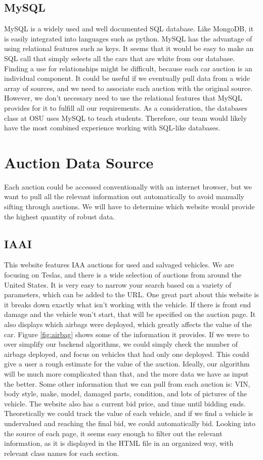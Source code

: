 \documentclass[draftclsnofoot,onecolumn,10pt]{IEEEtran}
\begin{document}
\subsection{MySQL}
MySQL is a widely used and well documented SQL database. Like MongoDB, it is easily integrated into languages such as python. MySQL has the advantage of using relational features such as keys. It seems that it would be easy to make an SQL call that simply selects all the cars that are white from our database. Finding a use for relationships might be difficult, because each car auction is an individual component. It could be useful if we eventually pull data from a wide array of sources, and we need to associate each auction with the original source. However, we don't necessary need to use the relational features that MySQL provides for it to fulfill all our requirements. As a consideration, the databases class at OSU uses MySQL to teach students. Therefore, our team would likely have the most combined experience working with SQL-like databases. \cite{mySQL}

\section{Auction Data Source}
 Each auction could be accessed conventionally with an internet browser, but we want to pull all the relevant information out automatically to avoid manually sifting through auctions. We will have to determine which website would provide the highest quantity of robust data.

\subsection{IAAI}
This website features IAA auctions for used and salvaged vehicles. We are focusing on Teslas, and there is a wide selection of auctions from around the United States. It is very easy to narrow your search based on a variety of parameters, which can be added to the URL. One great part about this website is it breaks down exactly what isn't working with the vehicle. If there is front end damage and the vehicle won't start, that will be specified on the auction page. It also displays which airbags were deployed, which greatly affects the value of the car. Figure \ref{fig:airbag} shows some of the information it provides. If we were to over simplify our backend algorithms, we could simply check the number of airbags deployed, and focus on vehicles that had only one deployed. This could give a user a rough estimate for the value of the auction. Ideally, our algorithm will be much more complicated than that, and the more data we have as input the better. Some other information that we can pull from each auction is: VIN, body style, make, model, damaged parts, condition, and lots of pictures of the vehicle. The website also has a current bid price, and time until bidding ends. Theoretically we could track the value of each vehicle, and if we find a vehicle is undervalued and reaching the final bid, we could automatically bid. Looking into the source of each page, it seems easy enough to filter out the relevant information, as it is displayed in the HTML file in an organized way, with relevant class names for each section. \cite{IAAI}
\end{document}
